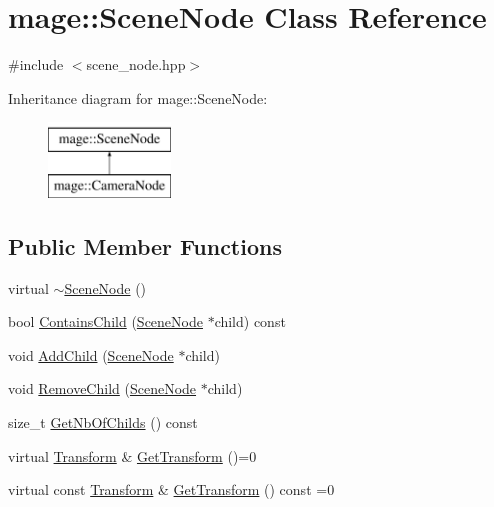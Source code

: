 \hypertarget{classmage_1_1_scene_node}{}\section{mage\+:\+:Scene\+Node Class Reference}
\label{classmage_1_1_scene_node}


{\ttfamily \#include $<$scene\+\_\+node.\+hpp$>$}

Inheritance diagram for mage\+:\+:Scene\+Node\+:\begin{figure}[H]
\begin{center}
\leavevmode
\includegraphics[height=2.000000cm]{classmage_1_1_scene_node}
\end{center}
\end{figure}
\subsection*{Public Member Functions}
\begin{DoxyCompactItemize}
\item 
virtual \hyperlink{classmage_1_1_scene_node_ad7ae54e25fb970772c0b0a6c5bac57ff}{$\sim$\+Scene\+Node} ()
\item 
bool \hyperlink{classmage_1_1_scene_node_ae810fa86b94a35e230faff5305946ba1}{Contains\+Child} (\hyperlink{classmage_1_1_scene_node}{Scene\+Node} $\ast$child) const
\item 
void \hyperlink{classmage_1_1_scene_node_ac07f89af783b1658a1f74205914f6fa3}{Add\+Child} (\hyperlink{classmage_1_1_scene_node}{Scene\+Node} $\ast$child)
\item 
void \hyperlink{classmage_1_1_scene_node_a42aa6487f21c948ab7ce6f64a57e5f11}{Remove\+Child} (\hyperlink{classmage_1_1_scene_node}{Scene\+Node} $\ast$child)
\item 
size\+\_\+t \hyperlink{classmage_1_1_scene_node_a99c5eb3c253a2e620bd85ac845d3bb77}{Get\+Nb\+Of\+Childs} () const
\item 
virtual \hyperlink{structmage_1_1_transform}{Transform} \& \hyperlink{classmage_1_1_scene_node_adbb5020be4054b53efa3682e71f9e6f1}{Get\+Transform} ()=0
\item 
virtual const \hyperlink{structmage_1_1_transform}{Transform} \& \hyperlink{classmage_1_1_scene_node_a9c8b7cde14ec45f383d214332f789736}{Get\+Transform} () const =0
\end{DoxyCompactItemize}
